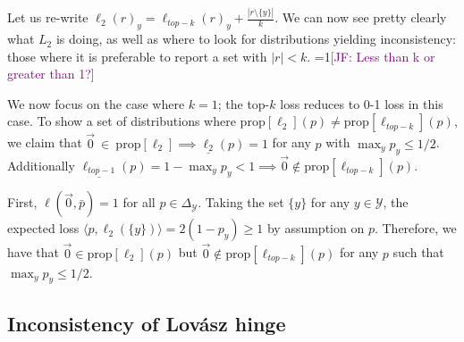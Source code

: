 \documentclass[12pt]{article}
\newcommand{\Comments}{1}
\newcommand{\mynote}[2]{\ifnum\Comments=1\textcolor{#1}{#2}\fi}
\newcommand{\mytodo}[2]{\ifnum\Comments=1%
  \todo[linecolor=#1!80!black,backgroundcolor=#1,bordercolor=#1!80!black]{#2}\fi}
\newcommand{\jessie}[1]{\mynote{purple}{[JF: #1]}}
\newcommand{\jessiet}[1]{\mytodo{purple!20!white}{JF: #1}}
\newcommand{\prop}[1]{\mathrm{prop}[#1]}
\newcommand{\simplex}{\Delta_\Y}
\newcommand{\Y}{\mathcal{Y}}
\newcommand{\risk}[1]{\underline{#1}}
\newcommand{\inprod}[2]{\langle #1, #2 \rangle}%
\begin{document}

Let us re-write $\ell_2(r)_y = \ell_{top-k}(r)_y + \frac{|r \setminus \{y\}|}{k}$.
We can now see pretty clearly what $L_2$ is doing, as well as where to look for distributions yielding inconsistency: those where it is preferable to report a set with $|r| < k$. \jessie{Less than k or greater than 1?}

We now focus on the case where $k=1$; the top-$k$ loss reduces to 0-1 loss in this case.
To show a set of distributions where $\prop{\ell_2}(p) \neq \prop{\ell_{top-k}}(p)$, we claim that $\vec{0}~\in~\prop{\ell_2} \implies \risk{\ell_2}(p) = 1$ for any $p$ with $\max_y p_y \leq 1/2$.
Additionally $\risk{\ell_{top-1}}(p) = 1 - \max_y p_y < 1 \implies \vec{0} \not\in \prop{\ell_{top-k}}(p)$.

First, $\ell(\vec{0}, \bar{p}) = 1$ for all $p \in \simplex$.
Taking the set $\{y\}$ for any $y \in \Y$, the expected loss $\inprod{p}{\ell_2(\{y\})} = 2 (1-p_y) \geq 1$ by assumption on $p$. 
Therefore, we have that $\vec{0} \in \prop{\ell_2}(p)$ but $\vec{0} \not\in \prop{\ell_{top-k}}(p)$ for any $p$ such that $\max_y p_y \leq 1/2$.





\subsection{Inconsistency of Lov\'asz hinge}
\label{sec:lovasz-hinge}
\end{document}
